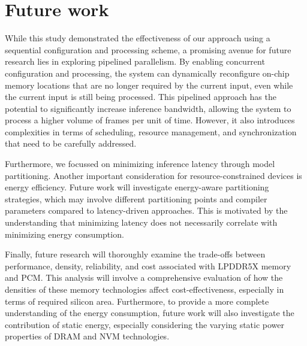 \section{Future work}
While this study demonstrated the effectiveness of our approach using a sequential configuration and processing scheme, a promising avenue for future research lies in exploring pipelined parallelism.
By enabling concurrent configuration and processing, the system can dynamically reconfigure on-chip memory locations that are no longer required by the current input, even while the current input is still being processed.
This pipelined approach has the potential to significantly increase inference bandwidth, allowing the system to process a higher volume of frames per unit of time.
However, it also introduces complexities in terms of scheduling, resource management, and synchronization that need to be carefully addressed.

Furthermore, we focussed on minimizing inference latency through model partitioning.
Another important consideration for resource-constrained devices is energy efficiency.
Future work will investigate energy-aware partitioning strategies, which may involve different partitioning points and compiler parameters compared to latency-driven approaches.
This is motivated by the understanding that minimizing latency does not necessarily correlate with minimizing energy consumption.

Finally, future research will thoroughly examine the trade-offs between performance, density, reliability, and cost associated with LPDDR5X memory and PCM.
This analysis will involve a comprehensive evaluation of how the densities of these memory technologies affect cost-effectiveness, especially in terms of required silicon area.
Furthermore, to provide a more complete understanding of the energy consumption, future work will also investigate the contribution of static energy, especially considering the varying static power properties of DRAM and NVM technologies.

